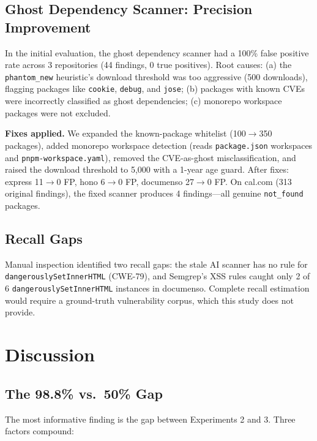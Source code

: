 \documentclass[conference,10pt]{IEEEtran}
\begin{document}
\subsection{Ghost Dependency Scanner: Precision Improvement}

In the initial evaluation, the ghost dependency scanner had a 100\% false positive rate across 3 repositories (44 findings, 0 true positives). Root causes: (a) the \texttt{phantom\_new} heuristic's download threshold was too aggressive (500 downloads), flagging packages like \texttt{cookie}, \texttt{debug}, and \texttt{jose}; (b) packages with known CVEs were incorrectly classified as ghost dependencies; (c) monorepo workspace packages were not excluded.

\textbf{Fixes applied.} We expanded the known-package whitelist (100$\rightarrow$350 packages), added monorepo workspace detection (reads \texttt{package.json} workspaces and \texttt{pnpm-workspace.yaml}), removed the CVE-as-ghost misclassification, and raised the download threshold to 5,000 with a 1-year age guard. After fixes: express 11$\rightarrow$0 FP, hono 6$\rightarrow$0 FP, documenso 27$\rightarrow$0 FP. On cal.com (313 original findings), the fixed scanner produces 4 findings---all genuine \texttt{not\_found} packages.

\subsection{Recall Gaps}

Manual inspection identified two recall gaps: the stale AI scanner has no rule for \texttt{dangerouslySetInnerHTML} (CWE-79), and Semgrep's XSS rules caught only 2 of 6 \texttt{dangerouslySetInnerHTML} instances in documenso. Complete recall estimation would require a ground-truth vulnerability corpus, which this study does not provide.

\section{Discussion}

\subsection{The 98.8\% vs.\ 50\% Gap}

The most informative finding is the gap between Experiments 2 and 3. Three factors compound:
\end{document}

